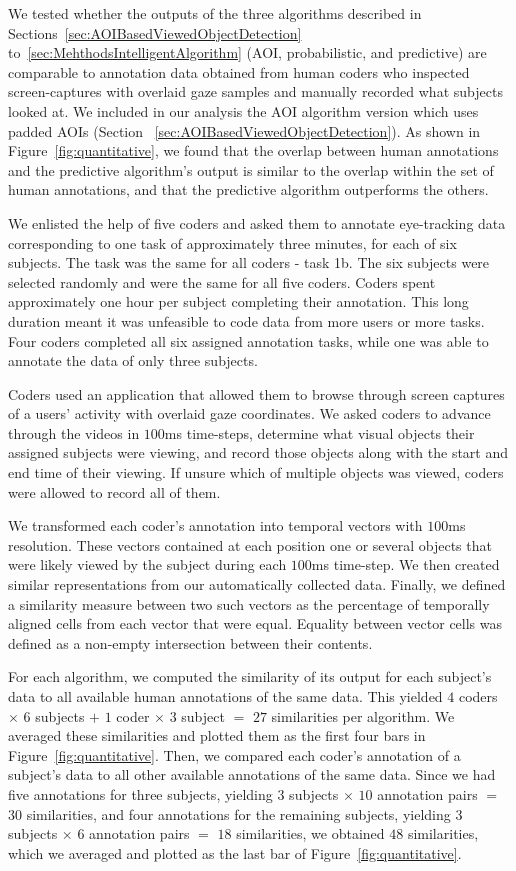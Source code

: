 We tested whether the outputs of the three algorithms described in Sections~\ref{sec:AOIBasedViewedObjectDetection} to~\ref{sec:MehthodsIntelligentAlgorithm} (AOI, probabilistic, and predictive) are comparable to annotation data obtained from human coders who inspected screen-captures with overlaid gaze samples and manually recorded what subjects looked at. We included in our analysis the AOI algorithm version which uses padded AOIs (Section ~\ref{sec:AOIBasedViewedObjectDetection}). As shown in Figure~\ref{fig:quantitative}, we found that the overlap between human annotations and the predictive algorithm's output is similar to the overlap within the set of human annotations, and that the predictive algorithm outperforms the others. 

We enlisted the help of five coders and asked them to annotate eye-tracking data corresponding to one task of approximately three minutes, for each of six subjects.  The task was the same for all coders - task 1b. The six subjects were selected randomly and were the same for all five coders. Coders spent approximately one hour per subject completing their annotation. This long duration meant it was unfeasible to code data from more users or more tasks. Four coders completed all six assigned annotation tasks, while one was able to annotate the data of only three subjects. 

Coders used an application that allowed them to browse through screen captures of a users' activity with overlaid gaze coordinates. We asked coders to advance through the videos in $100$ms time-steps, determine what visual objects their assigned subjects were viewing, and record those objects along with the start and end time of their viewing. If unsure which of multiple objects was viewed, coders were allowed to record all of them.  

We transformed each coder's annotation into temporal vectors with $100$ms resolution. These vectors contained at each position one or several objects that were likely viewed by the subject during each $100$ms time-step. We then created similar representations from our automatically collected data. Finally, we defined a similarity measure between two such vectors as the percentage of temporally aligned cells from each vector that were equal. Equality between vector cells was defined as a non-empty intersection between their contents.  

For each algorithm, we computed the similarity of its output for each subject's data to all available human annotations of the same data.  This yielded $4$ coders $\times$ $6$ subjects $+$  $1$ coder $\times$ $3$ subject $=$ $27$ similarities per algorithm. We averaged these similarities and plotted them as the first four bars in Figure~\ref{fig:quantitative}. Then, we compared each coder's annotation of a subject's data to all other available annotations of the same data. Since we had five annotations for three subjects, yielding $3$ subjects $\times$ $10$ annotation pairs $=$ $30$ similarities, and four annotations for the remaining subjects, yielding $3$ subjects $\times$ $6$ annotation pairs $=$ $18$ similarities, we obtained $48$ similarities, which we averaged and plotted as the last bar of Figure~\ref{fig:quantitative}.

